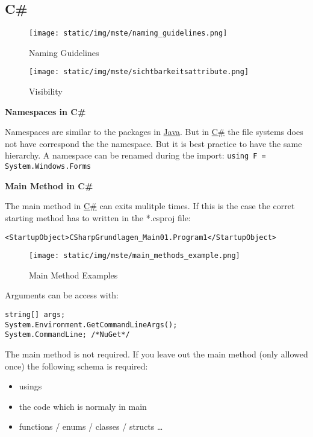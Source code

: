 \documentclass[11pt,twoside,landscape]{article}
\begin{document}
\begin{multicols}{3}
\section{C\#}
\label{sec:org1753f05}

\begin{figure}[htbp]
\centering
\texttt{[image: static/img/mste/naming\_guidelines.png]}
\caption{\label{fig:org497525f}Naming Guidelines}
\end{figure}

\begin{figure}[htbp]
\centering
\texttt{[image: static/img/mste/sichtbarkeitsattribute.png]}
\caption{\label{fig:org691e7d8}Visibility}
\end{figure}


\textbf{Namespaces in C\#}

Namespaces are similar to the packages in \href{../../../roam/20201116150053-java.org}{Java}.
But in \href{../../../roam/20211003114158-c.org}{C\#} the file systems does not have correspond the the namespace.
But it is best practice to have the same hierarchy.
A namespace can be renamed during the import: \texttt{using F = System.Windows.Forms}

\textbf{Main Method in C\#}

The main method in \href{../../../roam/20211003114158-c.org}{C\#} can exits mulitple times.
If this is the case the corret starting method has to written in the *.csproj file:

\lstset{language=XML,label= ,caption= ,captionpos=b,numbers=none}
\begin{lstlisting}
<StartupObject>CSharpGrundlagen_Main01.Program1</StartupObject>
\end{lstlisting}

\begin{figure}[htbp]
\centering
\texttt{[image: static/img/mste/main\_methods\_example.png]}
\caption{\label{fig:orgb09b27a}Main Method Examples}
\end{figure}

Arguments can be access with:
\lstset{language=csharp,label= ,caption= ,captionpos=b,numbers=none}
\begin{lstlisting}
string[] args;
System.Environment.GetCommandLineArgs();
System.CommandLine; /*NuGet*/
\end{lstlisting}


The main method is not required.
If you leave out the main method (only allowed once) the following schema is required:
\begin{itemize}
\item usings
\item the code which is normaly in main
\item functions / enums / classes / structs \ldots{}
\end{itemize}



\end{multicols}
\end{document}
